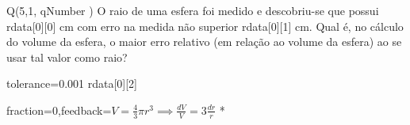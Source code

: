 \begin{numerical}[tolerance=0.001,points=5]{Q(5,1,{{ qNumber }})}
  O raio de uma esfera foi medido e descobriu-se que possui {{ rdata[0][0] }} cm
  com erro na medida não superior {{ rdata[0][1] }} cm. Qual é, no cálculo do
  volume da esfera, o maior erro relativo (em relação ao volume da esfera) ao se
  usar tal valor como raio?
\item[tolerance=0.001] {{ rdata[0][2] }}
\item[fraction=0,feedback={\(V=\frac{4}{3}\pi r^{3}\implies\frac{dV}{V}=3\frac{dr}{r}\)}] *
\end{numerical}
